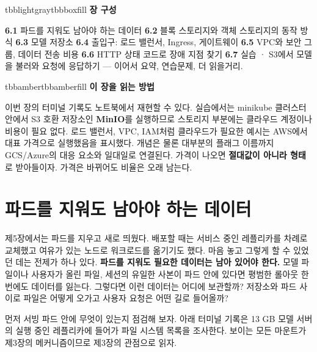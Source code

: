 \vspace{5.0pt}

\begin{calloutbox}{tbblightgray}{tbbboxfill}
{\normalsize\bfseries\color{tbbink}장 구성}\par\vspace{3pt}
\textbf{6.1} 파드를 지워도 남아야 하는 데이터    \textbf{6.2} 블록 스토리지와 객체 스토리지의 동작 방식    \textbf{6.3} 모델 저장소    \textbf{6.4} 출입구: 로드 밸런서, Ingress, 게이트웨이    \textbf{6.5} VPC와 보안 그룹, 데이터 전송 비용    \textbf{6.6} HTTP 상태 코드로 장애 지점 찾기    \textbf{6.7} 실습 · S3에서 모델을 불러와 요청에 응답하기 — 이어서 요약, 연습문제, 더 읽을거리.
\end{calloutbox}

\vspace{3.0pt}

\begin{calloutbox}{tbbamber}{tbbamberfill}
{\normalsize\bfseries\color{tbbamberdark}이 장을 읽는 방법}\par\vspace{3pt}
이번 장의 터미널 기록도 노트북에서 재현할 수 있다. 실습에서는 minikube 클러스터 안에서 S3 호환 저장소인 \textbf{MinIO}를 실행하므로 스토리지 부분에는 클라우드 계정이나 비용이 필요 없다. 로드 밸런서, VPC, IAM처럼 클라우드가 필요한 예시는 AWS에서 대표 가격으로 실행했음을 표시했다. 개념은 물론 대부분의 플래그 이름까지 GCS/Azure의 대응 요소와 일대일로 연결된다. 가격이 나오면 \textbf{절대값이 아니라 형태}로 받아들이자. 가격은 바뀌어도 비율은 오래 남는다.
\end{calloutbox}

\section{파드를 지워도 남아야 하는 데이터}

제5장에서는 파드를 지우고 새로 띄웠다. 배포할 때는 서비스 중인 레플리카를 차례로 교체했고 여유가 있는 노드로 워크로드를 옮기기도 했다. 마음 놓고 그렇게 할 수 있었던 데는 전제가 하나 있다. \textbf{파드를 지워도 필요한 데이터는 남아 있어야 한다.} 모델 파일이나 사용자가 올린 파일, 세션의 유일한 사본이 파드 안에 있다면 평범한 롤아웃 한 번에도 데이터를 잃는다. 그렇다면 이런 데이터는 어디에 보관할까? 저장소와 파드 사이로 파일은 어떻게 오가고 사용자 요청은 어떤 길로 들어올까?

먼저 서빙 파드 안에 무엇이 있는지 점검해 보자. 아래 터미널 기록은 13 GB 모델 서버의 실행 중인 레플리카에 들어가 파일 시스템 목록을 조사한다. 보이는 모든 마운트가 제3장의 메커니즘이므로 제3장의 관점으로 읽자.

